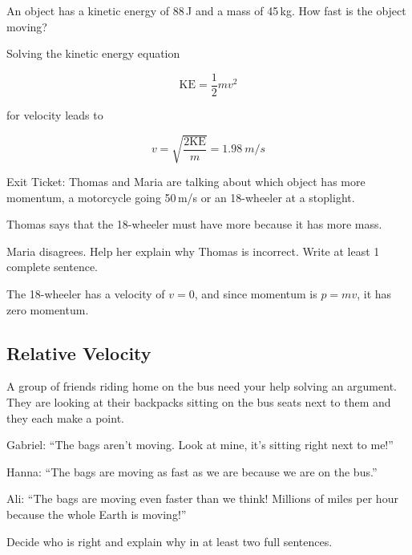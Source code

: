 \documentclass[answers]{exam}
\begin{document}
\begin{questions}
\question %
An object has a kinetic energy of 88\,J and a mass of 45\,kg. How fast is the object moving?

\begin{solution}
Solving the kinetic energy equation 

\begin{equation*}
    \mathrm{KE} = \frac{1}{2}mv^2
\end{equation*}

for velocity leads to

\begin{equation*}
    v = \sqrt{\frac{2\mathrm{KE}}{m}} = \boxed{\SI{1.98}{m/s}}
\end{equation*}
\end{solution}
 
\question %
Exit Ticket: Thomas and Maria are talking about which object has more momentum, a motorcycle going 50\,m/s or an 18-wheeler at a stoplight. 

Thomas says that the 18-wheeler must have more because it has more mass. 

Maria disagrees. Help her explain why Thomas is incorrect. Write at least 1 complete sentence.

\begin{solution}
    The 18-wheeler has a velocity of $v = 0$, and since momentum is $p = mv$, it has zero momentum. 
\end{solution}

\clearpage
\begin{EnvUplevel}
    \subsection{Relative Velocity}
\end{EnvUplevel}

\question
A group of friends riding home on the bus need your help solving an argument. They are looking at their backpacks sitting on the bus seats next to them and they each make a point. 

Gabriel: ``The bags aren't moving. Look at mine, it’s sitting right next to me!''

Hanna: ``The bags are moving as fast as we are because we are on the bus.''

Ali: ``The bags are moving even faster than we think! Millions of miles per hour because the whole Earth is moving!''

Decide who is right and explain why in at least two full sentences.


\end{questions}
\end{document}
